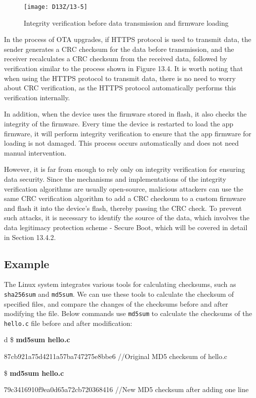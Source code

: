 \documentclass[a4paper,12pt]{book}
\begin{document}
\begin{figure}[!h]
    \centering
    \texttt{[image: D13Z/13-5]}
    \caption{Integrity verification before data transmission and firmware loading}
\end{figure}

In the process of OTA upgrades, if HTTPS protocol is used to transmit data, the sender generates a CRC checksum for the data before transmission, and the receiver recalculates a CRC checksum from the received data, followed by verification similar to the process shown in Figure 13.4. It is worth noting that when using the HTTPS protocol to transmit data, there is no need to worry about CRC verification, as the HTTPS protocol automatically performs this verification internally.

In addition, when the device uses the firmware stored in flash, it also checks the integrity of the firmware. Every time the device is restarted to load the app firmware, it will perform integrity verification to ensure that the app firmware for loading is not damaged. This process occurs automatically and does not need manual intervention.

However, it is far from enough to rely only on integrity verification for ensuring data security. Since the mechanisms and implementations of the integrity verification algorithms are usually open-source, malicious attackers can use the same CRC verification algorithm to add a CRC checksum to a custom firmware and flash it into the device’s flash, thereby passing the CRC check. To prevent such attacks, it is necessary to identify the source of the data, which involves the data legitimacy protection scheme - Secure Boot, which will be covered in detail in Section 13.4.2.

\subsection{Example}
The Linux system integrates various tools for calculating checksums, such as \verb|sha256sum| and \verb|md5sum|. We can use these tools to calculate the checksum of specified files, and compare the changes of the checksums before and after modifying the file. 	Below commands use \verb|md5sum| to calculate the checksums of the \verb|hello.c| file before and after modification:

\begin{codebloc}
\begin{tabular}{d}
\$ \textbf{md5sum hello.c}

87cb921a75d4211a57ba747275e8bbe6 //Original MD5 checksum of hello.c

\$ \textbf{md5sum hello.c}

79c3416910f9ea0d65a72cb720368416 //New MD5 checksum after adding one line
\end{tabular}
\end{codebloc}
\end{document}
